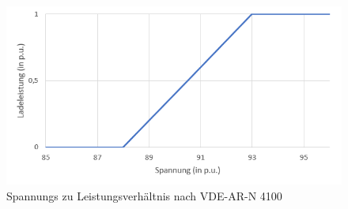 \begin{figure}[tb]
	\includegraphics[width=\linewidth]{img/VDE2.png}
	\caption{Spannungs zu Leistungsverhältnis nach VDE-AR-N 4100}
	\label{Abb_VDEController}
\end{figure}


